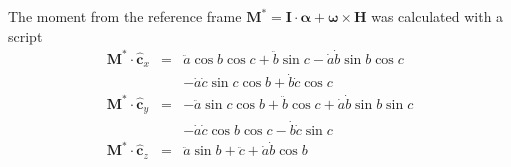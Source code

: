 \documentclass[lettersize,journal]{IEEEtran}
\begin{document}
The moment from the reference frame $\mathbf{M}^* = \mathbf{I}\cdot \boldsymbol\alpha + \boldsymbol\omega\times \mathbf{H}$ was calculated with a script
\begin{eqnarray}
  \mathbf{M}^* \cdot \mathbf{\hat{c}}_x &=& \ddot{a}\cos b\cos c + \ddot{b}\sin c- \dot{a}\dot{b}\sin b\cos c\nonumber\\
  &&- \dot{a}\dot{c}\sin c\cos b + \dot{b}\dot{c}\cos c\\
  \mathbf{M}^* \cdot \mathbf{\hat{c}}_y &=& - \ddot{a}\sin c\cos b + \ddot{b}\cos c+\dot{a}\dot{b}\sin b\sin c\nonumber\\
  &&- \dot{a}\dot{c}\cos b\cos c - \dot{b}\dot{c}\sin c \\
  \mathbf{M}^* \cdot \mathbf{\hat{c}}_z &=& \ddot{a} \sin b + \ddot{c} +\dot{a} \dot{b} \cos b
\end{eqnarray}




\appendices
\end{document}
